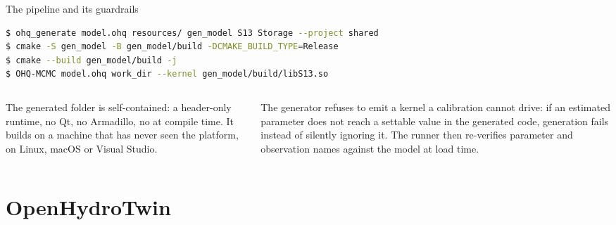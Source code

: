 \documentclass[aspectratio=169, 10pt]{beamer}
\begin{document}
\begin{frame}[fragile]{The pipeline and its guardrails}
\begin{lstlisting}[language=bash]
$ ohq_generate model.ohq resources/ gen_model S13 Storage --project shared
$ cmake -S gen_model -B gen_model/build -DCMAKE_BUILD_TYPE=Release
$ cmake --build gen_model/build -j
$ OHQ-MCMC model.ohq work_dir --kernel gen_model/build/libS13.so
\end{lstlisting}
  \vspace{0.3em}
  \begin{columns}[T,onlytextwidth]
    \begin{column}{0.48\textwidth}
      {\scriptsize
      The generated folder is \alert{self-contained}: a header-only runtime,
      no Qt, no Armadillo, no \ohq{} at compile time. It builds on a machine
      that has never seen the platform, on Linux, macOS or Visual Studio.}
    \end{column}
    \begin{column}{0.48\textwidth}
      {\scriptsize
      The generator \alert{refuses} to emit a kernel a calibration cannot
      drive: if an estimated parameter does not reach a settable value in the
      generated code, generation fails instead of silently ignoring it. The
      runner then re-verifies parameter and observation names against the model
      at load time.}
    \end{column}
  \end{columns}
\end{frame}

\section{OpenHydroTwin}
\end{document}
